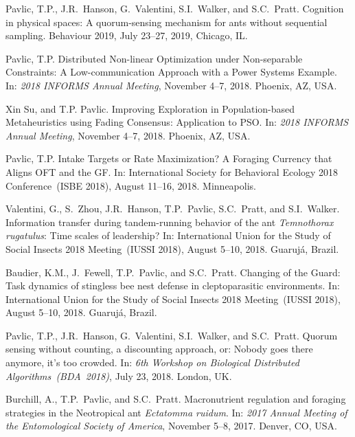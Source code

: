 \documentclass[10pt]{article}           %
\begin{document}
\begin{bibenum}
    \item Pavlic, T.P., J.R.~Hanson, G.~Valentini, S.I.~Walker, and
        S.C.~Pratt. Cognition in physical spaces: A quorum-sensing
        mechanism for ants without sequential sampling. Behaviour 2019,
        July 23--27, 2019, Chicago, IL.

    \item Pavlic, T.P. Distributed Non-linear Optimization under
        Non-separable Constraints: A Low-communication Approach with a
        Power Systems Example. In: \emph{2018 INFORMS Annual Meeting},
        November 4--7, 2018. Phoenix, AZ, USA.

    \item Xin Su, and T.P. Pavlic. Improving Exploration in
        Population-based Metaheuristics using Fading Consensus:
        Application to PSO. In: \emph{2018 INFORMS Annual Meeting},
        November 4--7, 2018. Phoenix, AZ, USA.

    \item Pavlic, T.P. Intake Targets or Rate Maximization? A Foraging
        Currency that Aligns OFT and the GF. In: International Society
        for Behavioral Ecology 2018 Conference~(ISBE 2018), August
        11--16, 2018. Minneapolis.

    \item Valentini, G., S.~Zhou, J.R.~Hanson, T.P.~Pavlic, S.C.~Pratt,
        and S.I.~Walker. Information transfer during tandem-running
        behavior of the ant \emph{Temnothorax rugatulus}: Time scales of
        leadership? In: International Union for the Study of Social
        Insects 2018 Meeting~(IUSSI 2018), August 5--10, 2018.
        Guaruj{\'{a}}, Brazil.

    \item Baudier, K.M., J.~Fewell, T.P.~Pavlic, and S.C.~Pratt.
        Changing of the Guard: Task dynamics of stingless bee nest
        defense in cleptoparasitic environments. In: International Union
        for the Study of Social Insects 2018 Meeting~(IUSSI 2018),
        August 5--10, 2018. Guaruj{\'{a}}, Brazil.

    \item Pavlic, T.P., J.R.~Hanson, G.~Valentini, S.I.~Walker, and
        S.C.~Pratt. Quorum sensing without counting, a discounting
        approach, or: Nobody goes there anymore, it’s too crowded. In:
        \emph{6th Workshop on Biological Distributed
        Algorithms~(BDA~2018)}, July 23, 2018. London, UK.

    \item Burchill, A., T.P.~Pavlic, and S.C.~Pratt. Macronutrient
        regulation and foraging strategies in the Neotropical ant
        \emph{Ectatomma ruidum}. In: \emph{2017 Annual Meeting of the
        Entomological Society of America}, November 5--8, 2017. Denver,
        CO, USA.


\end{bibenum}
\end{document}
